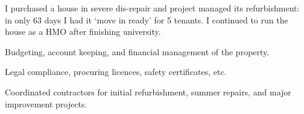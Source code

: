 I purchased a house in severe dis-repair and project managed its refurbishment: in only 63 days I had it `move in ready' for 5 tenants. I continued to run the house as a HMO after finishing university.
\vspace{0.25em}
\begin{tightemize}
  \item Budgeting, account keeping, and financial management of the property.
  \item Legal compliance, procuring licences, safety certificates, etc.
  \item Coordinated contractors for initial refurbishment, summer repairs, and major improvement projects.
\end{tightemize}
\sectionsep{}
